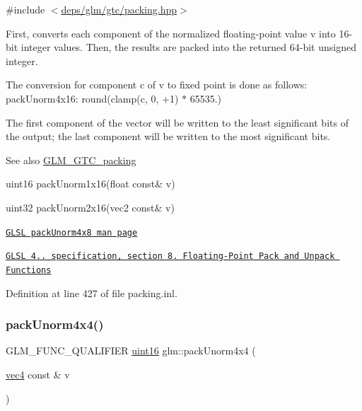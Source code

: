 {\ttfamily \#include $<$\hyperlink{gtc_2packing_8hpp}{deps/glm/gtc/packing.\+hpp}$>$}

First, converts each component of the normalized floating-\/point value v into 16-\/bit integer values. Then, the results are packed into the returned 64-\/bit unsigned integer.

The conversion for component c of v to fixed point is done as follows\+: pack\+Unorm4x16\+: round(clamp(c, 0, +1) $\ast$ 65535.)

The first component of the vector will be written to the least significant bits of the output; the last component will be written to the most significant bits.

\begin{DoxySeeAlso}{See also}
\hyperlink{group__gtc__packing}{G\+L\+M\+\_\+\+G\+T\+C\+\_\+packing} 

uint16 pack\+Unorm1x16(float const\& v) 

uint32 pack\+Unorm2x16(vec2 const\& v) 

\href{http://www.opengl.org/sdk/docs/manglsl/xhtml/packUnorm4x8.xml}{\tt G\+L\+SL pack\+Unorm4x8 man page} 

\href{http://www.opengl.org/registry/doc/GLSLangSpec.4.20.8.pdf}{\tt G\+L\+SL 4.. specification, section 8. Floating-\/\+Point Pack and Unpack Functions} 
\end{DoxySeeAlso}


Definition at line 427 of file packing.\+inl.

\mbox{\label{group__gtc__packing_gad493c9f130e91dd8a4b360b05dcea573}} 
\subsubsection{\texorpdfstring{pack\+Unorm4x4()}{packUnorm4x4()}}
{\footnotesize\ttfamily G\+L\+M\+\_\+\+F\+U\+N\+C\+\_\+\+Q\+U\+A\+L\+I\+F\+I\+ER \hyperlink{group__gtc__type__precision_gad8c2939e1fdd8e5828b31d95c52255d5}{uint16} glm\+::pack\+Unorm4x4 (\begin{DoxyParamCaption}\item[{\hyperlink{group__core__types_ga5881b1b022d7fd1b7218f5916532dd02}{vec4} const \&}]{v }\end{DoxyParamCaption})}



